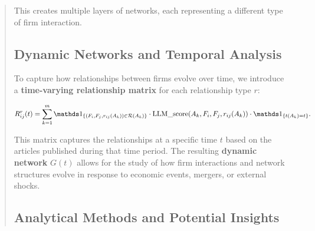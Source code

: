\begin{quote}
This creates multiple layers of networks, each representing a different type of firm interaction.



\subsection{Dynamic Networks and Temporal Analysis}

To capture how relationships between firms evolve over time, we introduce a \textbf{time-varying relationship matrix} for each relationship type $ r $:

$$
R^r_{ij}(t) = \sum_{k=1}^{m} \I{(F_i, F_j, r_{ij}(A_k)) \in \mathcal{R}(A_k)} \cdot \text{LLM\_score}(A_k, F_i, F_j, r_{ij}(A_k)) \cdot \I{t(A_k) = t}.
$$

This matrix captures the relationships at a specific time $ t $ based on the articles published during that time period. The resulting \textbf{dynamic network} $ G(t) $ allows for the study of how firm interactions and network structures evolve in response to economic events, mergers, or external shocks.

\subsection{Analytical Methods and Potential Insights}


\end{quote}
